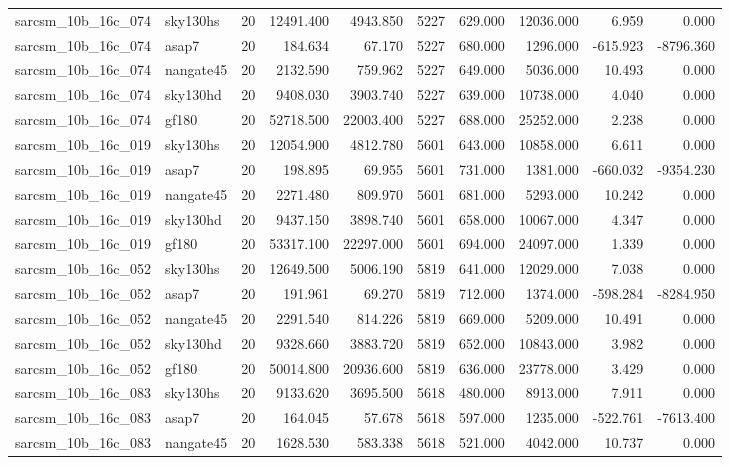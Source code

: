 \begin{longtable}{llrrrrrrrr}
sarcsm\_10b\_16c\_074 & sky130hs & 20 & 12491.400 & 4943.850 & 5227 & 629.000 & 12036.000 & 6.959 & 0.000 \\
sarcsm\_10b\_16c\_074 & asap7 & 20 & 184.634 & 67.170 & 5227 & 680.000 & 1296.000 & -615.923 & -8796.360 \\
sarcsm\_10b\_16c\_074 & nangate45 & 20 & 2132.590 & 759.962 & 5227 & 649.000 & 5036.000 & 10.493 & 0.000 \\
sarcsm\_10b\_16c\_074 & sky130hd & 20 & 9408.030 & 3903.740 & 5227 & 639.000 & 10738.000 & 4.040 & 0.000 \\
sarcsm\_10b\_16c\_074 & gf180 & 20 & 52718.500 & 22003.400 & 5227 & 688.000 & 25252.000 & 2.238 & 0.000 \\
sarcsm\_10b\_16c\_019 & sky130hs & 20 & 12054.900 & 4812.780 & 5601 & 643.000 & 10858.000 & 6.611 & 0.000 \\
sarcsm\_10b\_16c\_019 & asap7 & 20 & 198.895 & 69.955 & 5601 & 731.000 & 1381.000 & -660.032 & -9354.230 \\
sarcsm\_10b\_16c\_019 & nangate45 & 20 & 2271.480 & 809.970 & 5601 & 681.000 & 5293.000 & 10.242 & 0.000 \\
sarcsm\_10b\_16c\_019 & sky130hd & 20 & 9437.150 & 3898.740 & 5601 & 658.000 & 10067.000 & 4.347 & 0.000 \\
sarcsm\_10b\_16c\_019 & gf180 & 20 & 53317.100 & 22297.000 & 5601 & 694.000 & 24097.000 & 1.339 & 0.000 \\
sarcsm\_10b\_16c\_052 & sky130hs & 20 & 12649.500 & 5006.190 & 5819 & 641.000 & 12029.000 & 7.038 & 0.000 \\
sarcsm\_10b\_16c\_052 & asap7 & 20 & 191.961 & 69.270 & 5819 & 712.000 & 1374.000 & -598.284 & -8284.950 \\
sarcsm\_10b\_16c\_052 & nangate45 & 20 & 2291.540 & 814.226 & 5819 & 669.000 & 5209.000 & 10.491 & 0.000 \\
sarcsm\_10b\_16c\_052 & sky130hd & 20 & 9328.660 & 3883.720 & 5819 & 652.000 & 10843.000 & 3.982 & 0.000 \\
sarcsm\_10b\_16c\_052 & gf180 & 20 & 50014.800 & 20936.600 & 5819 & 636.000 & 23778.000 & 3.429 & 0.000 \\
sarcsm\_10b\_16c\_083 & sky130hs & 20 & 9133.620 & 3695.500 & 5618 & 480.000 & 8913.000 & 7.911 & 0.000 \\
sarcsm\_10b\_16c\_083 & asap7 & 20 & 164.045 & 57.678 & 5618 & 597.000 & 1235.000 & -522.761 & -7613.400 \\
sarcsm\_10b\_16c\_083 & nangate45 & 20 & 1628.530 & 583.338 & 5618 & 521.000 & 4042.000 & 10.737 & 0.000 \\

\end{longtable}
